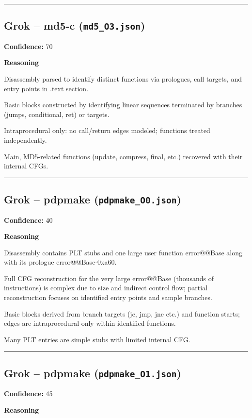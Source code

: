 \bigskip
\hrule
\bigskip

\subsection{Grok -- md5-c (\texttt{md5\_O3.json})}

\textbf{Confidence:} 70

\textbf{Reasoning}

Disassembly parsed to identify distinct functions via prologues, call targets, and entry points in .text section.

Basic blocks constructed by identifying linear sequences terminated by branches (jumps, conditional, ret) or targets.

Intraprocedural only: no call/return edges modeled; functions treated independently.

Main, MD5-related functions (update, compress, final, etc.) recovered with their internal CFGs.

\bigskip
\hrule
\bigskip

\subsection{Grok -- pdpmake (\texttt{pdpmake\_O0.json})}

\textbf{Confidence:} 40

\textbf{Reasoning}

Disassembly contains PLT stubs and one large user function error@@Base along with its prologue error@@Base-0xa60.

Full CFG reconstruction for the very large error@@Base (thousands of instructions) is complex due to size and indirect control flow; partial reconstruction focuses on identified entry points and sample branches.

Basic blocks derived from branch targets (je, jmp, jne etc.) and function starts; edges are intraprocedural only within identified functions.

Many PLT entries are simple stubs with limited internal CFG.

\bigskip
\hrule
\bigskip

\subsection{Grok -- pdpmake (\texttt{pdpmake\_O1.json})}

\textbf{Confidence:} 45

\textbf{Reasoning}

